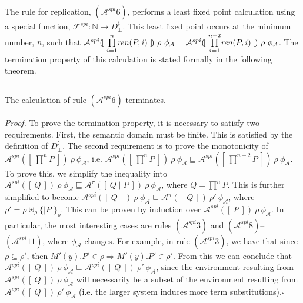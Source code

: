 \documentclass[10pt,a4paper,final,oneside,fleqn]{book}
\begin{document}
The rule for replication, $(\mathcal{A}^{spi}6)$, performs a least fixed point calculation using a special function, $\mathcal{F}^{spi}:\mathbb{N}\to D^\sharp_\bot$.  This least fixed point occurs at the minimum number, $n$, such that $\mathcal{A}^{spi}(\![~\underset{i=1}{\overset{n}{\prod}}\mbox{{\itshape ren\/}}(P,i)~]\!)~\rho~\phi_\mathcal{A}=\mathcal{A}^{spi}(\![~\underset{i=1}{\overset{n+2}{\prod}}\mbox{{\itshape ren\/}}(P,i)~]\!)~\rho~\phi_\mathcal{A}$.  The termination property of this calculation is stated formally in the following theorem.
\begin{theor}
$ $

\noindent
The calculation of rule $(\mathcal{A}^{spi}6)$ terminates.
\end{theor}
{\itshape Proof.\/} To prove the termination property, it is necessary to satisfy two requirements.  First, the semantic domain must be finite. This is satisfied by the definition of $D^\sharp_\bot$. The second requirement is to prove the monotonicity of $\mathcal{A}^{spi}(\![~\overset{n}{\prod}P~]\!)~\rho~\phi_\mathcal{A}$, i.e. $\mathcal{A}^{spi}(\![~\overset{n}{\prod}P~]\!)~\rho~\phi_\mathcal{A}\sqsubseteq\mathcal{A}^{spi}(\![~\overset{n+2}{\prod}P~]\!)~\rho~\phi_\mathcal{A}$.  To prove this, we simplify the inequality into $\mathcal{A}^{spi}(\![~Q~]\!)~\rho~\phi_\mathcal{A}\sqsubseteq\mathcal{A}^\pi(\![~Q\mid P~]\!)~\rho~\phi_\mathcal{A}$, where $Q=\overset{n}{\prod}P$. This is further simplified to become $\mathcal{A}^{spi}(\![~Q~]\!)~\rho~\phi_\mathcal{A}\sqsubseteq\mathcal{A}^\pi(\![~Q~]\!)~\rho'~\phi_\mathcal{A}$, where $\rho'=\rho\uplus_\rho\{\!|P|\!\}_\rho$. This can be proven by induction over $\mathcal{A}^{spi}(\![~P~]\!)~\rho~\phi_\mathcal{A}$. In particular, the most interesting cases are rules $(\mathcal{A}^{spi} 3)$ and $(\mathcal{A}^{spi} 8)$--$(\mathcal{A}^{spi} 11)$, where $\phi_\mathcal{A}$ changes.  For example, in rule $(\mathcal{A}^{spi} 3)$, we have that since $\rho\subseteq\rho'$, then $M'(y).P'\in\rho\Rightarrow M'(y).P'\in\rho'$. From this we can conclude that $\mathcal{A}^{spi}(\![~Q~]\!)~\rho~\phi_\mathcal{A}\sqsubseteq\mathcal{A}^{spi}(\![~Q~]\!)~\rho'~\phi_\mathcal{A}$, since the environment resulting from $\mathcal{A}^{spi}(\![~Q~]\!)~\rho~\phi_\mathcal{A}$ will necessarily be a subset of the environment resulting from $\mathcal{A}^{spi}(\![~Q~]\!)~\rho'~\phi_\mathcal{A}$ (i.e. the larger system induces more term substitutions).\hfill$\square$
\end{document}
